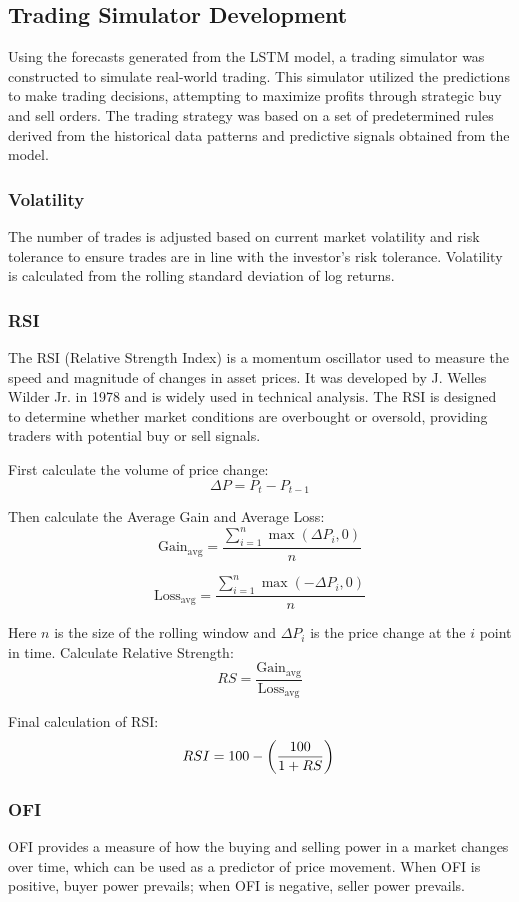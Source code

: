 \documentclass[conference]{IEEEtran}
\begin{document}
\subsection{Trading Simulator Development}
Using the forecasts generated from the LSTM model, a trading simulator was constructed to simulate real-world trading. This simulator utilized the predictions to make trading decisions, attempting to maximize profits through strategic buy and sell orders. The trading strategy was based on a set of predetermined rules derived from the historical data patterns and predictive signals obtained from the model.

\subsubsection{Volatility}
The number of trades is adjusted based on current market volatility and risk tolerance to ensure trades are in line with the investor's risk tolerance.
Volatility is calculated from the rolling standard deviation of log returns.

\subsubsection{RSI}
The RSI (Relative Strength Index) is a momentum oscillator used to measure the speed and magnitude of changes in asset prices. It was developed by J. Welles Wilder Jr. in 1978 and is widely used in technical analysis. The RSI is designed to determine whether market conditions are overbought or oversold, providing traders with potential buy or sell signals.

First calculate the volume of price change:\[\Delta P = P_t - P_{t-1}\]

Then calculate the Average Gain and Average Loss:\[\text{Gain}_{\text{avg}} = \frac{\sum_{i=1}^{n} \max(\Delta P_i, 0)}{n}\]

\[\text{Loss}_{\text{avg}} = \frac{\sum_{i=1}^{n} \max(-\Delta P_i, 0)}{n}\]

Here \(n\) is the size of the rolling window and \(\Delta P_i\) is the price change at the \(i\) point in time.
Calculate Relative Strength:\[RS = \frac{\text{Gain}_{\text{avg}}}{\text{Loss}_{\text{avg}}}\]

Final calculation of RSI:\[RSI = 100 - \left(\frac{100}{1 + RS}\right)\\\]


\subsubsection{OFI}
OFI provides a measure of how the buying and selling power in a market changes over time, which can be used as a predictor of price movement. When OFI is positive, buyer power prevails; when OFI is negative, seller power prevails.
\end{document}
